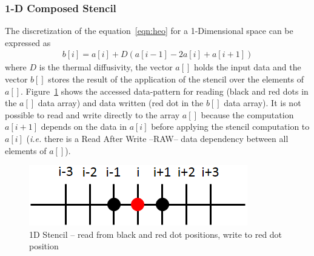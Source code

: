 \documentclass{acm_proc_article-sp}
\begin{document}
\subsubsection{1-D Composed Stencil}
\label{Generation1D}
The discretization of the equation~\eqref{eqn:heo} for a 1-Dimensional space can be expressed as
\begin{equation}
  \begin{split}
    b[i] = a[i] + D(a[i-1] - 2a[i] + a[i+1])
  \end{split}
  \label{eqn:hed-1d}
\end{equation}
where $D$ is the thermal diffusivity, the vector $a[]$ holds the input data and the vector $b[]$ stores the result of the application of the stencil over the elements of $a[]$. Figure~\ref{pic:1d-s01} shows the accessed data-pattern for reading (black and red dots in the $a[]$ data array) and data written (red dot in the $b[]$ data array). It is not possible to read and write directly to the array $a[]$ because the computation $a[i+1]$ depends on the data in $a[i]$ before applying the stencil computation to $a[i]$ (\textit{i.e.} there is a Read After Write --RAW-- data dependency between all elements of $a[]$).
\begin{figure}[ht!]
  \centering
  \includegraphics[scale=0.5]{pics/stencil_grid/1d-s01}
  \caption{1D Stencil -- read from black and red dot positions, write to red dot position}
  \label{pic:1d-s01}
\end{figure}
\end{document}
